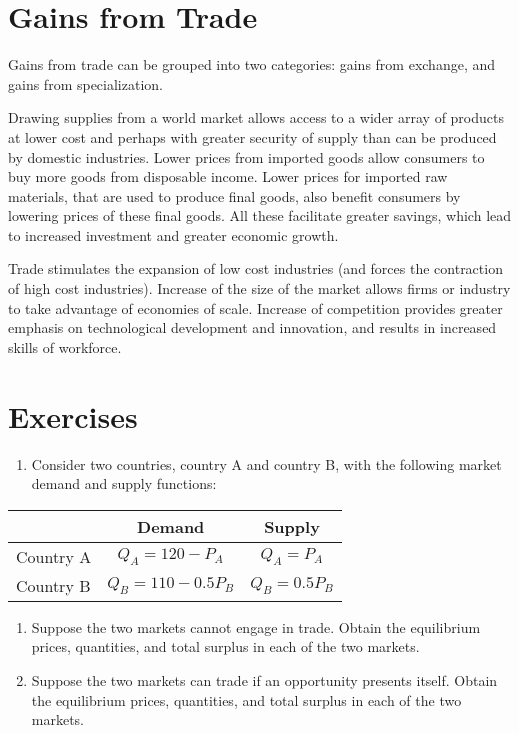 \documentclass[
  oneside]{book}
\providecommand{\tightlist}{%
  \setlength{\itemsep}{0pt}\setlength{\parskip}{0pt}}
\begin{document}
\hypertarget{gains-from-trade}{%
\section{Gains from Trade}\label{gains-from-trade}}

Gains from trade can be grouped into two categories: gains from exchange, and gains from specialization.

Drawing supplies from a world market allows access to a wider array of products at lower cost and perhaps with greater security of supply than can be produced by domestic industries. Lower prices from imported goods allow consumers to buy more goods from disposable income. Lower prices for imported raw materials, that are used to produce final goods, also benefit consumers by lowering prices of these final goods. All these facilitate greater savings, which lead to increased investment and greater economic growth.

Trade stimulates the expansion of low cost industries (and forces the contraction of high cost industries). Increase of the size of the market allows firms or industry to take advantage of economies of scale. Increase of competition provides greater emphasis on technological development and innovation, and results in increased skills of workforce.

\hypertarget{exercises-3}{%
\section*{Exercises}\label{exercises-3}}

\begin{enumerate}
\def\labelenumi{\arabic{enumi}.}
\tightlist
\item
  Consider two countries, country A and country B, with the following market demand and supply functions:
\end{enumerate}

\begin{longtable}[]{@{}lcc@{}}
\toprule
& Demand & Supply \\
\midrule
\endhead
Country A & \(Q_A=120-P_A\) & \(Q_A=P_A\) \\
Country B & \(Q_B=110-0.5P_B\) & \(Q_B=0.5P_B\) \\
\bottomrule
\end{longtable}

\begin{enumerate}
\def\labelenumi{\roman{enumi}.}
\tightlist
\item
  Suppose the two markets cannot engage in trade. Obtain the equilibrium prices, quantities, and total surplus in each of the two markets.
\item
  Suppose the two markets can trade if an opportunity presents itself. Obtain the equilibrium prices, quantities, and total surplus in each of the two markets.
\end{enumerate}
\end{document}
